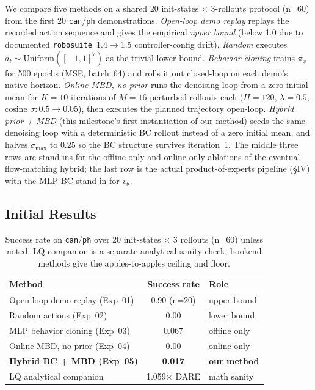 \documentclass[letterpaper, 10 pt, conference]{ieeeconf}
\begin{document}
We compare five methods on a shared 20 init-states $\times$
3-rollouts protocol (n=60) from the first 20
\texttt{can}/\texttt{ph} demonstrations. \textit{Open-loop demo
replay} replays the recorded action sequence and gives the
empirical \emph{upper bound} (below 1.0 due to documented
\texttt{robosuite}~1.4$\to$1.5 controller-config drift).
\textit{Random} executes $a_t\!\sim\!\mathrm{Uniform}([-1,1]^7)$
as the trivial lower bound. \textit{Behavior cloning} trains
$\pi_\phi$ for 500 epochs (MSE, batch~64) and rolls it out
closed-loop on each demo's native horizon. \textit{Online MBD,
no prior} runs the denoising loop from a zero initial mean for
$K\!=\!10$ iterations of $M\!=\!16$ perturbed rollouts each
($H\!=\!120$, $\lambda\!=\!0.5$, cosine
$\sigma\!:\!0.5\!\to\!0.05$), then executes the planned
trajectory open-loop. \textit{Hybrid prior + MBD} (this
milestone's first instantiation of our method) seeds the same
denoising loop with a deterministic BC rollout instead of a
zero initial mean, and halves $\sigma_{\max}$ to $0.25$ so the BC
structure survives iteration~1. The middle three rows are
stand-ins for the offline-only and online-only ablations of the
eventual flow-matching hybrid; the last row is the actual
product-of-experts pipeline (\S IV) with the MLP-BC stand-in for
$v_\theta$.

\subsection{Initial Results}

\begin{table}[h]
\centering
\small
\caption{Success rate on \texttt{can}/\texttt{ph} over 20 init-states
$\times$ 3 rollouts (n=60) unless noted. LQ companion is a separate
analytical sanity check; bookend methods give the apples-to-apples
ceiling and floor.}
\label{tab:results}
\begin{tabular}{l c l}
\hline
Method & Success rate & Role \\
\hline
Open-loop demo replay (Exp~01)        & 0.90 (n=20)        & upper bound \\
Random actions (Exp~02)               & 0.00               & lower bound \\
MLP behavior cloning (Exp~03)         & 0.067              & offline only \\
Online MBD, no prior (Exp~04)         & 0.00               & online only \\
\textbf{Hybrid BC + MBD (Exp~05)}     & \textbf{0.017}     & \textbf{our method} \\
\hline
LQ analytical companion               & 1.059$\times$ DARE & math sanity \\
\hline
\end{tabular}
\end{table}
\end{document}
